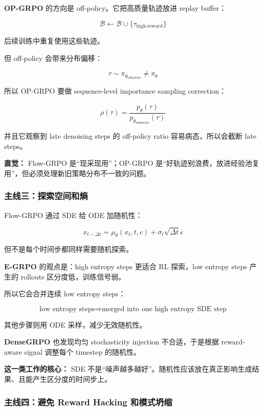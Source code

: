 \textbf{OP-GRPO} 的方向是 off-policy。它把高质量轨迹放进 replay buffer：

\[
\mathcal{B}
\leftarrow
\mathcal{B}
\cup
\{\tau_\text{high-reward}\}
\]

后续训练中重复使用这些轨迹。

但 off-policy 会带来分布偏移：

\[
\tau
\sim
\pi_{\theta_\text{behavior}}
\neq
\pi_{\theta}
\]

所以 OP-GRPO 要做 sequence-level importance sampling correction：

\[
\rho(\tau)
=
\frac{
p_\theta(\tau)
}{
p_{\theta_\text{behavior}}(\tau)
}
\]

并且它观察到 late denoising steps 的 off-policy ratio 容易病态，所以会截断 late steps。

\begin{intubox}
\textbf{直觉：} Flow-GRPO 是“现采现用”；OP-GRPO 是“好轨迹别浪费，放进经验池复用”，但必须处理新旧策略分布不一致的问题。
\end{intubox}

\subsubsection{主线三：探索空间和熵}

Flow-GRPO 通过 SDE 给 ODE 加随机性：

\[
x_{t-\Delta t}
=
\mu_\theta(x_t,t,c)
+
\sigma_t\sqrt{\Delta t}\epsilon
\]

但不是每个时间步都同样需要随机探索。

\textbf{E-GRPO} 的观点是：high entropy steps 更适合 RL 探索，low entropy steps 产生的 rollouts 区分度低，训练信号弱。

所以它会合并连续 low entropy steps：

\[
\text{low entropy steps}
\Rightarrow
\text{merged into one high entropy SDE step}
\]

其他步骤则用 ODE 采样，减少无效随机性。

\textbf{DenseGRPO} 也发现均匀 stochasticity injection 不合适，于是根据 reward-aware signal 调整每个 timestep 的随机性。

\begin{warnbox}
\textbf{这一类工作的核心：} SDE 不是“噪声越多越好”。随机性应该放在真正影响生成结果、且能产生区分度的时间步上。
\end{warnbox}

\subsubsection{主线四：避免 Reward Hacking 和模式坍缩}


